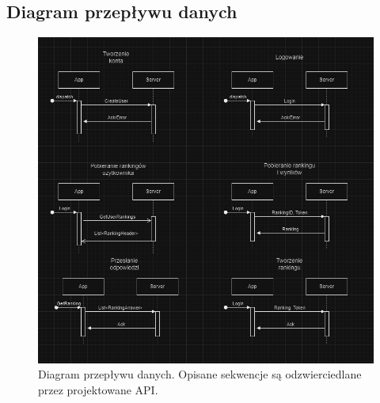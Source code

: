 \documentclass{article}
\begin{document}
\subsection{Diagram przepływu danych}
\begin{figure}[h!]
    \centering
    \includegraphics[width=\linewidth]{data-flow-diagram.PNG}
    \caption{Diagram przepływu danych. Opisane sekwencje są odzwierciedlane przez projektowane API.}
\end{figure}

\pagebreak
\end{document}
